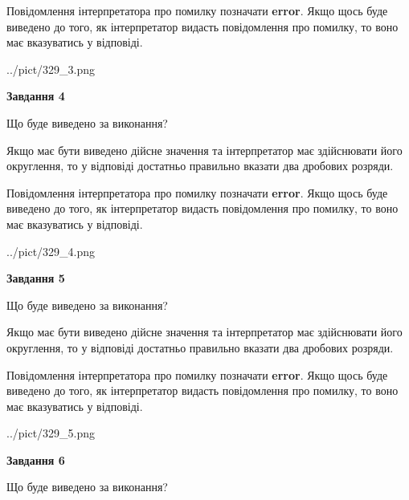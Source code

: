 \documentclass[12pt, ukrainian]{article}
\begin{document}
{\begin {Large}
Повідомлення інтерпретатора про помилку позначати \textbf{error}.
Якщо щось буде виведено до того, як інтерпретатор видасть повідомлення про помилку, 
то воно має вказуватись у відповіді. \par

\begin{center}
	{../pict/329_3.png}
\end{center}
\newpage

{\begin {center}\textbf{Завдання 4}\end {center}}\par
Що буде виведено за виконання? \par

Якщо має бути виведено дійсне значення та інтерпретатор має здійснювати його округлення, 
то у відповіді достатньо правильно вказати два дробових розряди.

Повідомлення інтерпретатора про помилку позначати \textbf{error}.
Якщо щось буде виведено до того, як інтерпретатор видасть повідомлення про помилку, 
то воно має вказуватись у відповіді. \par

\begin{center}
	{../pict/329_4.png}
\end{center}
\newpage

{\begin {center}\textbf{Завдання 5}\end {center}}\par
Що буде виведено за виконання? \par

Якщо має бути виведено дійсне значення та інтерпретатор має здійснювати його округлення, 
то у відповіді достатньо правильно вказати два дробових розряди.

Повідомлення інтерпретатора про помилку позначати \textbf{error}.
Якщо щось буде виведено до того, як інтерпретатор видасть повідомлення про помилку, 
то воно має вказуватись у відповіді. \par

\begin{center}
	{../pict/329_5.png}
\end{center}
\newpage

{\begin {center}\textbf{Завдання 6}\end {center}}\par
Що буде виведено за виконання? \par


\end{Large}}
\end{document}
